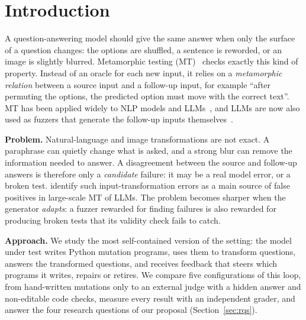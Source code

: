 \documentclass[sigconf]{acmart}
\begin{document}
\maketitle

\section{Introduction}

A question-answering model should give the same answer when only the surface of a question changes: the options are
shuffled, a sentence is reworded, or an image is slightly blurred. Metamorphic testing (MT)~\cite{chen1998metamorphic}
checks exactly this kind of property. Instead of an oracle for each new input, it relies on a \emph{metamorphic
relation} between a source input and a follow-up input, for example ``after permuting the options, the predicted
option must move with the correct text''. MT has been applied widely to NLP models and
LLMs~\cite{ribeiro2020checklist,manino2022systematicity,hyun2023metal,rajan2024kontest,cho2025mt}, and LLMs are now
also used as fuzzers that generate the follow-up inputs themselves~\cite{xia2024fuzz4all,liu2026hallutrigger}.

\textbf{Problem.} Natural-language and image transformations are not exact. A paraphrase can quietly change what is
asked, and a strong blur can remove the information needed to answer. A disagreement between the source and follow-up
answers is therefore only a \emph{candidate} failure: it may be a real model error, or a broken test.
\citet{cho2025mt} identify such input-transformation errors as a main source of false positives in large-scale MT of
LLMs. The problem becomes sharper when the generator \emph{adapts}: a fuzzer rewarded for finding failures is also
rewarded for producing broken tests that its validity check fails to catch.

\textbf{Approach.} We study the most self-contained version of the setting: the model under test writes Python mutation
programs, uses them to transform questions, answers the transformed questions, and receives feedback that steers
which programs it writes, repairs or retires. We compare five configurations of this loop, from hand-written
mutations only to an external judge with a hidden answer and non-editable code checks, measure every result with an
independent grader, and answer the four research questions of our proposal (Section~\ref{sec:rqs}).
\end{document}
